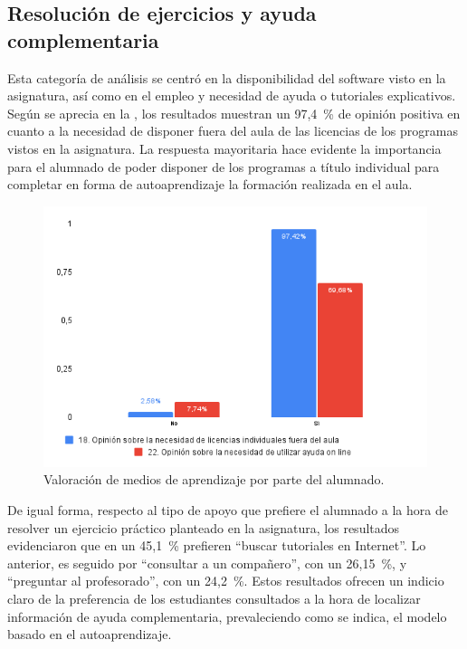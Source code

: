 \documentclass[spanish]{textolivre}
\begin{document}
\subsection{Resolución de ejercicios y ayuda complementaria}\label{sec-secoes}
Esta categoría de análisis se centró en la disponibilidad del software visto en la asignatura, así como en el empleo y necesidad de ayuda o tutoriales explicativos. Según se aprecia en la , los resultados muestran un 97,4~\% de opinión positiva en cuanto a la necesidad de disponer fuera del aula de las licencias de los programas vistos en la asignatura. La respuesta mayoritaria hace evidente la importancia para el alumnado de poder disponer de los programas a título individual para completar en forma de autoaprendizaje la formación realizada en el aula.

\begin{figure}[h]
\centering
\begin{minipage}{.8\textwidth}
\includegraphics[width=\linewidth]{Fig3.png}
\caption{Valoración de medios de aprendizaje por parte del alumnado.}
\label{fig3}
\end{minipage}
\end{figure}

De igual forma, respecto al tipo de apoyo que prefiere el alumnado a la hora de resolver un ejercicio práctico planteado en la asignatura, los resultados evidenciaron que en un 45,1~\% prefieren “buscar tutoriales en Internet”. Lo anterior, es seguido por “consultar a un compañero”, con un 26,15~\%, y “preguntar al profesorado”, con un 24,2~\%. Estos resultados ofrecen un indicio claro de la preferencia de los estudiantes consultados a la hora de localizar información de ayuda complementaria, prevaleciendo como se indica, el modelo basado en el autoaprendizaje. 
\end{document}
